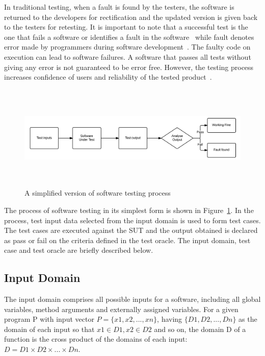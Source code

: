 In traditional testing, when a fault is found by the testers, the software is returned to the developers for rectification and the updated version is given back to the testers for retesting. It is important to note that a successful test is the one that fails a software or identifies a fault in the software~\cite{myers2011art} while fault denotes error made by programmers during software development~\cite{american1984}. The faulty code on execution can lead to software failures. A software that passes all tests without giving any error is not guaranteed to be error free. However, the testing process increases confidence of users and reliability of the tested product~\cite{dahl1972structured}. 

\bigskip
\begin{figure}[h]
	\centering
	\centerline{\includegraphics[width=16cm, height=5cm]{chapter2/softwareTesting.png}}
	\bigskip
	\caption{A simplified version of software testing process}
	\label{fig:softwareTestingParts_2}
\end{figure}
\bigskip

The process of software testing in its simplest form is shown in Figure~\ref{fig:softwareTestingParts_2}. In the process, test input data selected from the input domain is used to form test cases. The test cases are executed against the SUT and the output obtained is declared as pass or fail on the criteria defined in the test oracle. The input domain, test case and test oracle are briefly described below.

\subsection{Input Domain} 
The input domain comprises all possible inputs for a software, including all global variables, method arguments and externally assigned variables. For a given program P with input vector $ P =\{x1, x2, . . . , xn\}$, having $\{D1, D2, . . . , Dn\}$ as the domain of each input so that $x1 \in D1, x2 \in D2$ and so on, the domain D of a function is the cross product of the domains of each input: $D = D1 \times D2 \times . . . \times Dn$.

